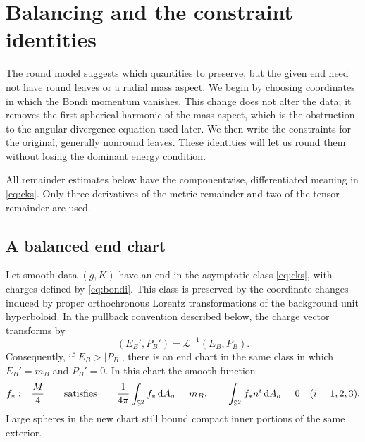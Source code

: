 \section{Balancing and the constraint identities}\label{sec:geometry}

The round model suggests which quantities to preserve, but the given
end need not have round leaves or a radial mass aspect. We begin by
choosing coordinates in which the Bondi momentum vanishes. This change
does not alter the data; it removes the first spherical harmonic of the
mass aspect, which is the obstruction to the angular divergence equation
used later. We then write the constraints for the original, generally
nonround leaves. These identities will let us round them without losing
the dominant energy condition.

All remainder estimates below have the componentwise, differentiated
meaning in \eqref{eq:cks}. Only three derivatives of the metric
remainder and two of the tensor remainder are used.

\subsection{A balanced end chart}

\begin{lemma}\label{lem:balance}
Let smooth data $(g,K)$ have an end in the asymptotic class
\eqref{eq:cks}, with charges defined by \eqref{eq:bondi}.
This class is preserved by the coordinate changes
induced by proper orthochronous Lorentz transformations of the background
unit hyperboloid. In the pullback convention described below, the charge
vector transforms by
\[
 (E_B',P_B')=\mathscr L^{-1}(E_B,P_B).
\]
Consequently, if $E_B>|P_B|$, there is an end chart in the same class in
which $E_B'=m_B$ and $P_B'=0$. In this chart the smooth function
\begin{equation}\label{eq:balanced-aspect}
 f_*:=\frac{M}{4}
 \qquad\text{satisfies}\qquad
 \frac{1}{4\pi}\int_{\mathbb S^2}f_*\,\mathrm dA_\sigma=m_B,
 \qquad
 \int_{\mathbb S^2}f_*n^i\,\mathrm dA_\sigma=0
 \quad (i=1,2,3).
\end{equation}
Large spheres in the new chart still bound compact inner portions of the
same exterior.
\end{lemma}

